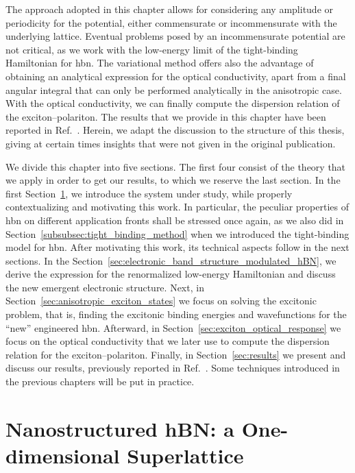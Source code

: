 The approach adopted in this chapter allows for considering any amplitude or periodicity for the potential, either commensurate or incommensurate with the underlying lattice.
Eventual problems posed by an incommensurate potential are not critical, as we work with the low-energy limit of the tight-binding Hamiltonian for \gls{hbn}.
The variational method offers also the advantage of obtaining an analytical expression for the optical conductivity, apart from a final angular integral that can only be performed analytically in the anisotropic case.
With the optical conductivity, we can finally compute the dispersion relation of the exciton--polariton.
The results that we provide in this chapter have been reported in Ref.~\cite{Ninhos_Tserkezis_Mortensen_Peres_2024}.
Herein, we adapt the discussion to the structure of this thesis, giving at certain times insights that were not given in the original publication.

We divide this chapter into five sections.
The first four consist of the theory that we apply in order to get our results, to which we reserve the last section.
In the first Section~\ref{sec:nanostructured_hBN}, we introduce the system under study, while properly contextualizing and motivating this work.
In particular, the peculiar properties of \gls{hbn} on different application fronts shall be stressed once again, as we also did in Section~\ref{subsubsec:tight_binding_method} when we introduced the tight-binding model for \gls{hbn}.
After motivating this work, its technical aspects follow in the next sections.
In the Section~\ref{sec:electronic_band_structure_modulated_hBN}, we derive the expression for the renormalized low-energy Hamiltonian and discuss the new emergent electronic structure.
Next, in Section~\ref{sec:anisotropic_exciton_states} we focus on solving the excitonic problem, that is, finding the excitonic binding energies and wavefunctions for the ``new'' engineered \gls{hbn}.
Afterward, in Section~\ref{sec:exciton_optical_response} we focus on the optical conductivity that we later use to compute the dispersion relation for the exciton--polariton.
Finally, in Section~\ref{sec:results} we present and discuss our results, previously reported in Ref.~\cite{Ninhos_Tserkezis_Mortensen_Peres_2024}.
Some techniques introduced in the previous chapters will be put in practice.

\section{Nanostructured hBN: a One-dimensional Superlattice}
\label{sec:nanostructured_hBN}

